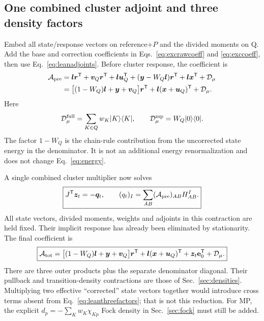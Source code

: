 \subsection{One combined cluster adjoint and three density factors}
Embed all state/response vectors on reference+$P$ and the divided moments
on Q. Add the base and correction coefficients in
Eqs.~\eqref{eq:excrawcoeff} and \eqref{eq:exccoeff}, then use
Eq.~\eqref{eq:leanadjoints}. Before cluster response, the coefficient is
\begin{align}
 \mathcal A_{\rm pre}
 &=\bm l\bm r^{\mathsf T}+\bm v_Q\bm r^{\mathsf T}+\bm l\bm u_Q^{\mathsf T}
   +(\bm y-W_Q\bm l)\bm r^{\mathsf T}+\bm l\bm x^{\mathsf T}
   +\mathcal D_\mu\\
 &=\big[(1-W_Q)\bm l+\bm y+\bm v_Q\big]\bm r^{\mathsf T}
                 +\bm l(\bm x+\bm u_Q)^{\mathsf T}+\mathcal D_\mu.
 \label{eq:leanpre}
\end{align}
Here
\begin{equation}
 \mathcal D_\mu^{\rm full}=\sum_{K\in Q}w_K\lvert K\rangle\langle K\rvert,
 \qquad \mathcal D_\mu^{\rm mp}=W_Q\lvert 0\rangle\langle 0\rvert.
 \label{eq:leandiagonal}
\end{equation}
The factor $1-W_Q$ is the chain-rule contribution from the uncorrected
state energy in the denominator. It is not an additional energy
renormalization and does not change Eq.~\eqref{eq:energy}.

A single combined cluster multiplier now solves
\begin{equation}
 \boxed{J^{\mathsf T}\bm z_t=-\bm q_t,\qquad
 (q_t)_I=\sum_{AB}(\mathcal A_{\rm pre})_{AB}H^I_{AB}.}
 \label{eq:leancluster}
\end{equation}
All state vectors, divided moments, weights and adjoints in this contraction
are held fixed. Their implicit response has already been eliminated by
stationarity. The final coefficient is
\begin{equation}
 \boxed{\mathcal A_{\rm tot}
 =\big[(1-W_Q)\bm l+\bm y+\bm v_Q\big]\bm r^{\mathsf T}
 +\bm l(\bm x+\bm u_Q)^{\mathsf T}+\bm z_t\mathbf e_0^{\mathsf T}+\mathcal D_\mu.}
 \label{eq:leanthreefactors}
\end{equation}
There are three outer products plus the separate denominator diagonal.
Their pullback and transition-density contractions are those of
Sec.~\ref{sec:densities}. Multiplying two effective ``corrected'' state
vectors together would introduce cross terms absent from
Eq.~\eqref{eq:leanthreefactors}; that is not this reduction.
For MP, the explicit $d_p=-\sum_Kw_K\chi_{Kp}$ Fock density in
Sec.~\ref{sec:fock} must still be added.

